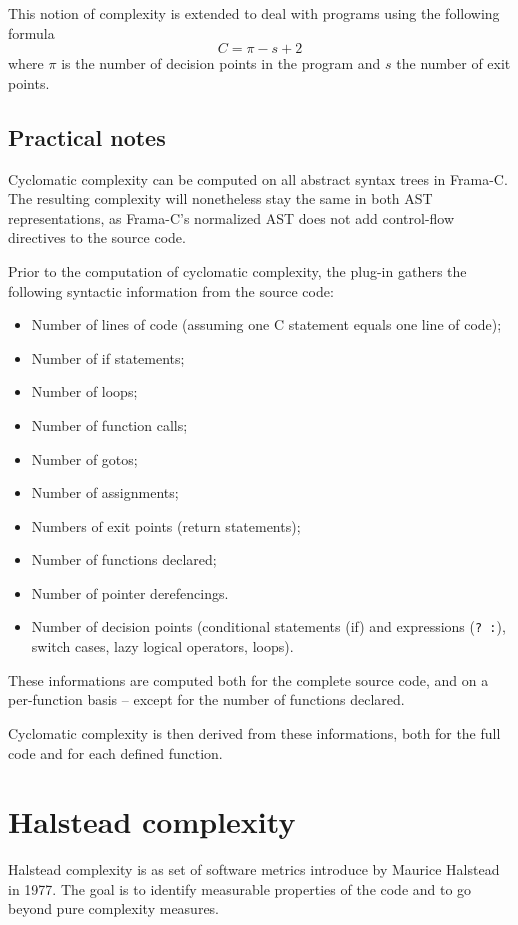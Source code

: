 \documentclass{frama-c-book}
\begin{document}
This notion of complexity is extended to deal with programs using the following
formula
\[ C = \pi - s + 2 \]
where $\pi$ is the number of decision points in the program
and $s$ the number of exit points.



\subsection{Practical notes}

Cyclomatic complexity can be computed on all abstract syntax trees in
Frama-C. The resulting complexity will nonetheless stay the same in both AST
representations, as Frama-C's normalized AST does not add control-flow
directives to the source code.

Prior to the computation of cyclomatic complexity, the plug-in gathers the
following syntactic information from the source code:
\begin{itemize}

\item Number of lines of code (assuming one C statement equals one line of code);
\item Number of if statements;
\item Number of loops;
\item Number of function calls;
\item Number of gotos;
\item Number of assignments;
\item Numbers of exit points (return statements);
\item Number of functions declared;
\item Number of pointer derefencings.
\item Number of decision points (conditional statements (if) and expressions
  (\verb|? :|), switch cases,
  lazy logical operators, loops).
\end{itemize}

These informations are computed both for the complete source code, and
on a per-function basis -- except for the number of functions
declared.

Cyclomatic complexity is then derived from these informations, both for the
full code and for each defined function.

\section{Halstead complexity}
\label{sec:halstead-complexity}
Halstead complexity is as set of software metrics introduce by Maurice Halstead
\cite{HalsteadComplexity} in 1977. The goal is to identify measurable properties
of the code and to go beyond pure complexity measures.
\end{document}
